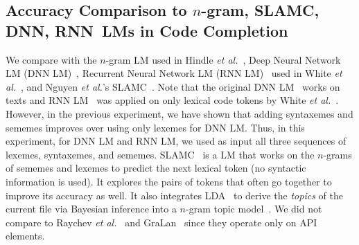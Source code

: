 \subsection{Accuracy Comparison to $n$-gram, SLAMC, DNN, RNN~LMs in Code Completion}





We compare {\tool} with the $n$-gram LM used in Hindle {\em et
  al.}~\cite{natural}, Deep Neural Network LM (DNN LM)~\cite{DNNLM12},
Recurrent Neural Network LM (RNN LM)~\cite{mikolov10,white-msr15} used
in White {\em et al.}~\cite{white-msr15}, and Nguyen {\em et al.}'s
SLAMC~\cite{fse13}.
%
Note that the original DNN LM~\cite{DNNLM12} works on texts and RNN
LM~\cite{mikolov10} was applied on only lexical code tokens by White
{\em et al.}~\cite{white-msr15}.
%
However, in the previous experiment, we have shown that adding
syntaxemes and sememes improves over using only lexemes for DNN LM.
Thus, in this experiment, for DNN LM and RNN LM, we used as input all
three sequences of lexemes, syntaxemes, and sememes.
SLAMC~\cite{fse13} is a LM that works on the $n$-grams of sememes and
lexemes to predict the next lexical token (no syntactic information is
used). It explores the pairs of tokens that often go together to
improve its accuracy as well. 
%
It also integrates LDA~\cite{lda} to derive the {\em topics} of the
current file via Bayesian inference into a $n$-gram topic
model~\cite{fse13}.
%
%
We did not compare {\tool} to Raychev {\em et al.}~\cite{ethz-pldi14}
and GraLan~\cite{icse15} since they operate only on API elements.

